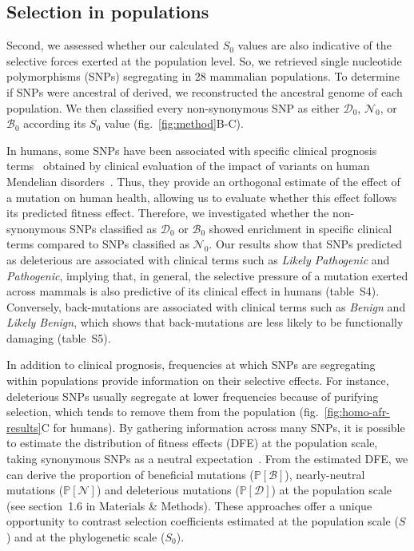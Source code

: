 \documentclass[12pt]{article}
\newcommand{\proba}{\mathbb{P}}
\newcommand{\Sphy}{S_{0}}
\newcommand{\SphyDel}{\mathcal{D}_0}
\newcommand{\SphyNeu}{\mathcal{N}_0}
\newcommand{\SphyBen}{\mathcal{B}_0}
\newcommand{\Spop}{S}
\newcommand{\SpopDel}{\mathcal{D}}
\newcommand{\SpopNeu}{\mathcal{N}}
\newcommand{\SpopBen}{\mathcal{B}}
\newcommand{\ProbaPopDel}{\proba [ \SpopDel]}
\newcommand{\ProbaPopNeu}{\proba [ \SpopNeu ]}
\newcommand{\ProbaPopBen}{\proba [ \SpopBen ]}
\begin{document}
\subsection*{Selection in populations}
Second, we assessed whether our calculated $\Sphy$ values are also indicative of the selective forces exerted at the population level.
So, we retrieved single nucleotide polymorphisms (SNPs) segregating in 28 mammalian populations.
To determine if SNPs were ancestral of derived, we reconstructed the ancestral genome of each population.
We then classified every non-synonymous SNP as either $\SphyDel$, $\SphyNeu$, or $\SphyBen$ according its $\Sphy$ value (fig.~\ref{fig:method}B-C).

In humans, some SNPs have been associated with specific clinical prognosis terms~\cite{landrum_clinvar_2018} obtained by clinical evaluation of the impact of variants on human Mendelian disorders~\cite{landrum_clinvar_2018}.
Thus, they provide an orthogonal estimate of the effect of a mutation on human health, allowing us to evaluate whether this effect follows its predicted fitness effect.
Therefore, we investigated whether the non-synonymous SNPs classified as $\SphyDel$ or $\SphyBen$ showed enrichment in specific clinical terms compared to SNPs classified as $\SphyNeu$.
Our results show that SNPs predicted as deleterious are associated with clinical terms such as \textit{Likely Pathogenic} and \textit{Pathogenic}, implying that, in general, the selective pressure of a mutation exerted across mammals is also predictive of its clinical effect in humans (table~S4).
Conversely, back-mutations are associated with clinical terms such as \textit{Benign} and \textit{Likely Benign}, which shows that back-mutations are less likely to be functionally damaging (table~S5).

In addition to clinical prognosis, frequencies at which SNPs are segregating within populations provide information on their selective effects.
For instance, deleterious SNPs usually segregate at lower frequencies because of purifying selection, which tends to remove them from the population (fig.~\ref{fig:homo-afr-results}C for humans).
By gathering information across many SNPs, it is possible to estimate the distribution of fitness effects (DFE) at the population scale, taking synonymous SNPs as a neutral expectation~\cite{eyre-walker_distribution_2006, eyre-walker_estimating_2009, galtier_adaptive_2016, tataru_inference_2017}.
From the estimated DFE, we can derive the proportion of beneficial mutations ($\ProbaPopBen$), nearly-neutral mutations ($\ProbaPopNeu$) and deleterious mutations ($\ProbaPopDel$) at the population scale (see section~1.6 in Materials \& Methods).
These approaches offer a unique opportunity to contrast selection coefficients estimated at the population scale ($\Spop$) and at the phylogenetic scale ($\Sphy$).
\end{document}
